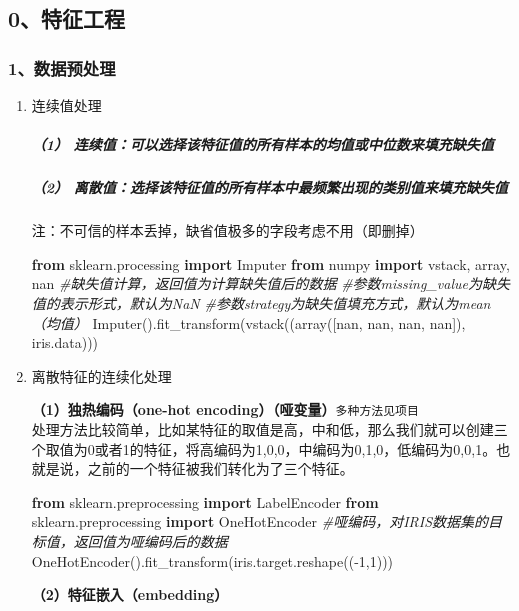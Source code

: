 \documentclass[
]{article}
\author{}
\date{}
\newenvironment{Shaded}{}{}
\newcommand{\CommentTok}[1]{\textcolor[rgb]{0.38,0.63,0.69}{\textit{#1}}}
\newcommand{\DecValTok}[1]{\textcolor[rgb]{0.25,0.63,0.44}{#1}}
\newcommand{\ImportTok}[1]{\textcolor[rgb]{0.00,0.50,0.00}{\textbf{#1}}}
\newcommand{\NormalTok}[1]{#1}
\newcommand{\OperatorTok}[1]{\textcolor[rgb]{0.40,0.40,0.40}{#1}}
\begin{document}
\subsection{0、特征工程}\label{0ux7279ux5f81ux5de5ux7a0b}

\subsubsection{1、数据预处理}\label{1ux6570ux636eux9884ux5904ux7406}

\begin{enumerate}
\def\labelenumi{\arabic{enumi}.}
\item
  连续值处理

  \subparagraph{（1）
  连续值：可以选择该特征值的所有样本的均值或中位数来填充缺失值}\label{1-ux8fdeux7eedux503cux53efux4ee5ux9009ux62e9ux8be5ux7279ux5f81ux503cux7684ux6240ux6709ux6837ux672cux7684ux5747ux503cux6216ux4e2dux4f4dux6570ux6765ux586bux5145ux7f3aux5931ux503c}

  \subparagraph{（2）
  离散值：选择该特征值的所有样本中最频繁出现的类别值来填充缺失值}\label{2-ux79bbux6563ux503cux9009ux62e9ux8be5ux7279ux5f81ux503cux7684ux6240ux6709ux6837ux672cux4e2dux6700ux9891ux7e41ux51faux73b0ux7684ux7c7bux522bux503cux6765ux586bux5145ux7f3aux5931ux503c}

  注：不可信的样本丢掉，缺省值极多的字段考虑不用（即删掉）

\begin{Shaded}
\begin{Highlighting}[]
\ImportTok{from}\NormalTok{ sklearn.processing }\ImportTok{import}\NormalTok{ Imputer}
\ImportTok{from}\NormalTok{ numpy }\ImportTok{import}\NormalTok{ vstack, array, nan}
\CommentTok{\#缺失值计算，返回值为计算缺失值后的数据}
\CommentTok{\#参数missing\_value为缺失值的表示形式，默认为NaN}
\CommentTok{\#参数strategy为缺失值填充方式，默认为mean（均值）}
\NormalTok{Imputer().fit\_transform(vstack((array([nan, nan, nan, nan]), iris.data)))}
\end{Highlighting}
\end{Shaded}
\item
  离散特征的连续化处理

  \textbf{（1）独热编码（one-hot
  encoding）（哑变量）}\texttt{多种方法见项目}\\
  处理方法比较简单，比如某特征的取值是高，中和低，那么我们就可以创建三个取值为0或者1的特征，将高编码为1,0,0，中编码为0,1,0，低编码为0,0,1。也就是说，之前的一个特征被我们转化为了三个特征。

\begin{Shaded}
\begin{Highlighting}[]
\ImportTok{from}\NormalTok{ sklearn.preprocessing }\ImportTok{import}\NormalTok{ LabelEncoder}
\ImportTok{from}\NormalTok{ sklearn.preprocessing }\ImportTok{import}\NormalTok{ OneHotEncoder}
\CommentTok{\#哑编码，对IRIS数据集的目标值，返回值为哑编码后的数据}
\NormalTok{OneHotEncoder().fit\_transform(iris.target.reshape((}\OperatorTok{{-}}\DecValTok{1}\NormalTok{,}\DecValTok{1}\NormalTok{)))}
\end{Highlighting}
\end{Shaded}

  \textbf{（2）特征嵌入（embedding）}
\end{enumerate}
\end{document}
